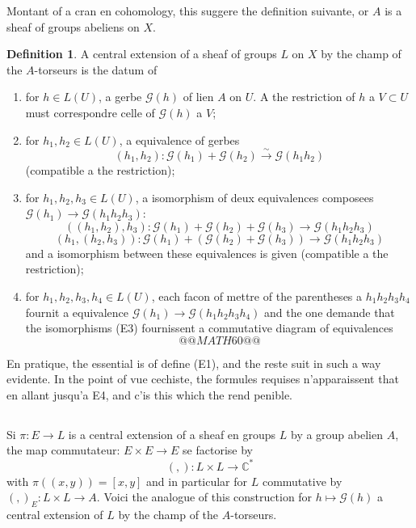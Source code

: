 \documentclass[12pt,a4paper]{article}
\theoremstyle{plain}
\theoremstyle{definition}
\newtheorem{definition}[theorem]{Definition}
\theoremstyle{remark}
\newcommand{\C}{\mathbb{C}}
\begin{document}
Montant of a cran en cohomology, this suggere the definition suivante, or $A$ is
a sheaf of groups abeliens on $X$.

\begin{definition}
A central extension of a sheaf of groups $L$ on $X$ by the champ
of the $A$-torseurs is the datum of
\begin{enumerate}[label=(E\arabic*)]
\item for $h \in L(U)$, a gerbe $\mathscr{G}(h)$ of lien $A$ on $U$. A the restriction of $h$ a $V \subset U$ must
correspondre celle of $\mathscr{G}(h)$ a $V$;
\item for $h_1, h_2 \in L(U)$, a equivalence of gerbes
\[
(h_1, h_2) : \mathscr{G}(h_1) + \mathscr{G}(h_2) \xrightarrow{\sim} \mathscr{G}(h_1 h_2)
\]
(compatible a the restriction);
\item for $h_1, h_2, h_3 \in L(U)$, a isomorphism of deux equivalences composees $\mathscr{G}(h_1) \to \mathscr{G}(h_1 h_2 h_3)$:
\[
((h_1, h_2), h_3) : \mathscr{G}(h_1) + \mathscr{G}(h_2) + \mathscr{G}(h_3) \to \mathscr{G}(h_1 h_2 h_3)
\]
\[
(h_1, (h_2, h_3)) : \mathscr{G}(h_1) + (\mathscr{G}(h_2) + \mathscr{G}(h_3)) \to \mathscr{G}(h_1 h_2 h_3)
\]
and a isomorphism between these equivalences is given (compatible a the restriction);
\item for $h_1, h_2, h_3, h_4 \in L(U)$, each facon of mettre of the parentheses a $h_1 h_2 h_3 h_4$
fournit a equivalence $\mathscr{G}(h_1) \to \mathscr{G}(h_1 h_2 h_3 h_4)$ and the one demande that the isomorphisms (E3)
fournissent a commutative diagram of equivalences
\[
@@MATH60@@
\]
\end{enumerate}
\end{definition}

En pratique, the essential is of define (E1), and the reste suit in such a way evidente. In
the point of vue cechiste, the formules requises n'apparaissent that en allant jusqu'a E4,
and c'is this which the rend penible.

\subsection{}

Si $\pi : E \to L$ is a central extension of a sheaf en groups $L$ by a
group abelien $A$, the map commutateur: $E \times E \to E$ se factorise by
\[
(,) : L \times L \to \C^*
\]
with $\pi((x,y)) = [x,y]$ and in particular for $L$ commutative by $(,)_E : L \times L \to A$.
Voici the analogue of this construction for $h \mapsto \mathscr{G}(h)$ a central extension of $L$ by
the champ of the $A$-torseurs.
\end{document}
